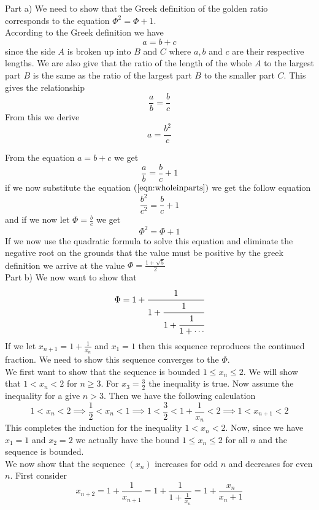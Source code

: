 \documentclass[11pt,reqno]{article}
\begin{document}
Part a) We need to show that the Greek definition of the golden ratio corresponds to the equation $\Phi^2 = \Phi + 1$. \\
\indent According to the Greek definition we have \[a = b + c\] since the side $A$ is broken up into $B$ and $C$ where $a,b$ and $c$ are their respective lengths. We are also give that the ratio of the length of the whole $A$ to the largest part $B$ is the same as the ratio of the largest part $B$ to the smaller part $C$. This gives the relationship \[\frac{a}{b} =\frac{b}{c}\] From this we derive \begin{equation}
a = \frac{b^2}{c} \label{eqn:wholeinparts}
\end{equation}

From the equation $a = b + c$ we get \[ \frac{a}{b} = \frac{b}{c} + 1 \] if we now substitute the equation $(\ref{eqn:wholeinparts})$ we get the follow equation \[ \frac{b^2}{c^2} = \frac{b}{c} + 1 \] and if we now let $\Phi = \frac{b}{c}$ we get 
\begin{equation} 
\Phi^2 = \Phi + 1 \label{eqn:goldenquadratic}
\end{equation} 
If we now use the quadratic formula to solve this equation and eliminate the negative root on the grounds that the value must be positive by the greek definition we arrive at the value $\Phi = \frac{1 + \sqrt{5}}{2}$\\

Part b) We now want to show that \[ \Phi = 1+ \cfrac{1}{1+\cfrac{1}{1+\cfrac{1}{1+\cdots}}} \] If we let $x_{n+1} = 1 + \frac{1}{x_{n}}$ and $x_1 = 1$ then this sequence reproduces the continued fraction. We need to show this sequence converges to the $\Phi$. \\
\indent We first want to show that the sequence is bounded $1 \le x_n \le 2$. We will show that $1 < x_n < 2$ for $n \ge 3$. For $x_3 = \frac{3}{2}$ the inequality is true. Now assume the inequality for a give $n > 3$. Then we have the following calculation
\[ 1 < x_n < 2 \implies \frac{1}{2} < x_n < 1 \implies 1 < \frac{3}{2} < 1 + \frac{1}{x_n} < 2  \implies 1 < x_{n+1} < 2\]
This completes the induction for the inequality $1 < x_n < 2$. Now, since we have $x_1 = 1$ and $x_2 = 2$ we actually have the bound $1 \le x_n \le 2$ for all $n$ and the sequence is bounded.\\
\indent We now show that the sequence $(x_n)$ increases for odd $n$ and decreases for even $n$. First consider 
\begin{equation}
 x_{n+2} = 1 + \frac{1}{x_{n+1}} = 1 + \frac{1}{1 + \frac{1}{x_n}} = 1 + \frac{x_n}{x_n + 1} \label{eqn:extendfib}
\end{equation} 
\end{document}
